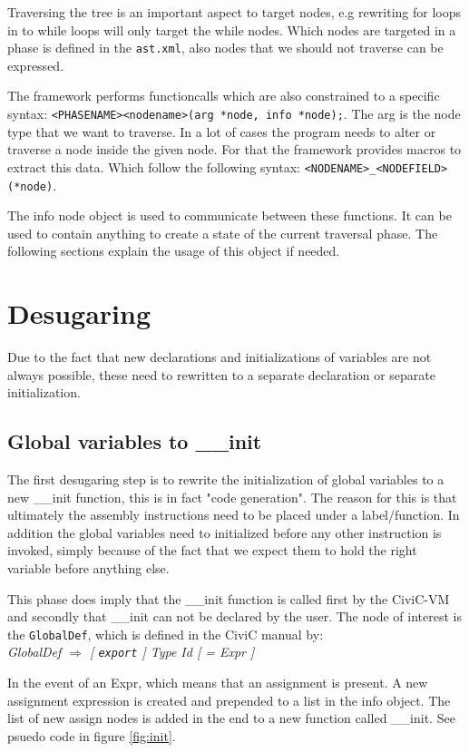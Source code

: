 \documentclass[a4paper]{article}
\begin{document}
Traversing the tree is an important aspect to target nodes, e.g rewriting for
loops in to while loops will only target the while nodes. Which nodes are
targeted in a phase is defined in the \texttt{ast.xml}, also nodes that we
should not traverse can be expressed.

The framework performs functioncalls which are also constrained to a specific
syntax: \texttt{<PHASENAME><nodename>(arg *node, info *node);}. The arg is the
node type that we want to traverse. In a lot of cases the program needs to
alter or traverse a node inside the given node. For that the framework provides
macros to extract this data. Which follow the following syntax:
\texttt{<NODENAME>\_<NODEFIELD>(*node)}.

The info node object is used to communicate between these functions. It can be
used to contain anything to create a state of the current traversal phase. The
following sections explain the usage of this object if needed.

\section{Desugaring}
Due to the fact that new declarations and initializations of variables are not
always possible, these need to rewritten to a separate declaration or separate
initialization.

\subsection{Global variables to \_\_init}
The first desugaring step is to rewrite the initialization of global variables
to a new \_\_init function, this is in fact "code generation". The reason for
this is that ultimately the assembly instructions need to be placed under a
label/function. In addition the global variables need to initialized before any
other instruction is invoked, simply because of the fact that we expect them to
hold the right variable before anything else.

This phase does imply that the \_\_init function is called first by the
CiviC-VM and secondly that \_\_init can not be declared by the user.
The node of interest is the \texttt{GlobalDef}, which is defined in the CiviC
manual by:\\
\textit{GlobalDef $\Rightarrow$ [ \texttt{export} ] Type Id [ = Expr ]}

In the event of an Expr, which means that an assignment is present. A new
assignment expression is created and prepended to a list in the info object.
The list of new assign nodes is added in the end to a new function called
\_\_init. See psuedo code in figure \ref{fig:init}.
\end{document}
